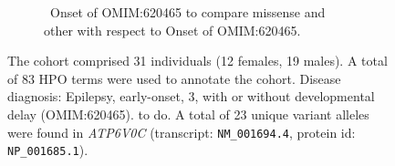 \begin{figure}[htbp]
\vspace{2em}

\begin{subfigure}[b]{0.95\textwidth}
\captionsetup{justification=raggedright,singlelinecheck=false}
\caption{ Onset of OMIM:620465 to compare missense and other with respect to Onset of OMIM:620465. }
\end{subfigure}

\vspace{2em}

\caption{ The cohort comprised 31 individuals (12 females, 19 males). A total of 83 HPO terms were used to annotate the cohort. Disease diagnosis: Epilepsy, early-onset, 3, with or without developmental delay (OMIM:620465). to do. A total of 23 unique variant alleles were found in \textit{ATP6V0C} (transcript: \texttt{NM\_001694.4}, protein id: \texttt{NP\_001685.1}).}
\end{figure}
